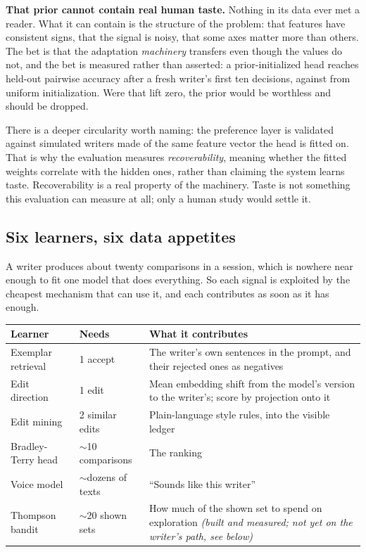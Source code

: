 \documentclass{article}
\begin{document}
\textbf{That prior cannot contain real human taste.} Nothing in its data ever met a reader.
What it can contain is the structure of the problem: that features have consistent signs,
that the signal is noisy, that some axes matter more than others. The bet is that the
adaptation \emph{machinery} transfers even though the values do not, and the bet is measured
rather than asserted: a prior-initialized head reaches \rPriorAtTen{} held-out pairwise
accuracy after a fresh writer's first ten decisions, against \rUniformAtTen{} from uniform
initialization. Were that lift zero, the prior would be worthless and should be dropped.

There is a deeper circularity worth naming: the preference layer is validated against
simulated writers made of the same feature vector the head is fitted on. That is why the
evaluation measures \emph{recoverability}, meaning whether the fitted weights correlate
with the hidden ones, rather than claiming the system learns taste. Recoverability is a real
property of the machinery. Taste is not something this evaluation can measure at all; only
a human study would settle it.



\subsection{Six learners, six data appetites}

A writer produces about twenty comparisons in a session, which is nowhere near enough to
fit one model that does everything. So each signal is exploited by the cheapest mechanism
that can use it, and each contributes as soon as it has enough.

\begin{center}
\begin{tabular}{@{}llp{}@{}}
\toprule
\textbf{Learner} & \textbf{Needs} & \textbf{What it contributes} \\
\midrule
Exemplar retrieval & 1 accept & The writer's own sentences in the prompt, and their
rejected ones as negatives \\
Edit direction & 1 edit & Mean embedding shift from the model's version to the
writer's; score by projection onto it \\
Edit mining & 2 similar edits & Plain-language style rules, into the visible ledger \\
Bradley-Terry head & $\sim$10 comparisons & The ranking \\
Voice model & $\sim$dozens of texts & ``Sounds like this writer'' \\
Thompson bandit & $\sim$20 shown sets & How much of the shown set to spend on exploration
\emph{(built and measured; not yet on the writer's path, see below)} \\
\bottomrule
\end{tabular}
\end{center}
\end{document}
